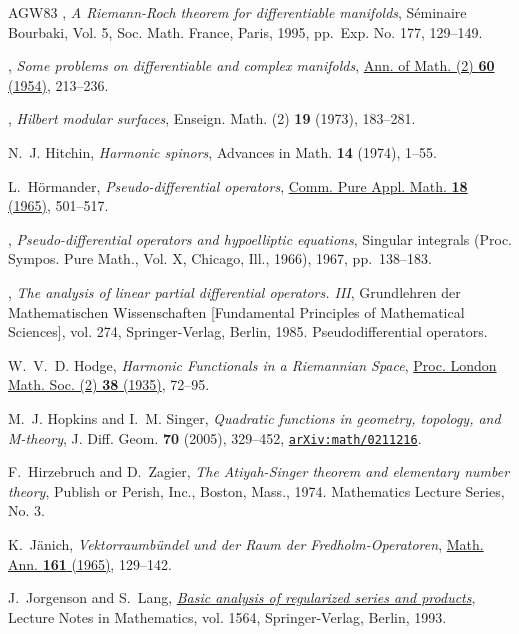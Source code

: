\documentclass[11pt]{amsart}
\theoremstyle{definition}
\theoremstyle{remark}
\theoremstyle{plain}
\numberwithin{equation}{section}
\renewcommand{\:}{\colon}
\begin{document}
\begin{thebibliography}{AGW83}
\bysame, \emph{A {R}iemann-{R}och theorem for differentiable manifolds},
  S\'{e}minaire {B}ourbaki, {V}ol. 5, Soc. Math. France, Paris, 1995, pp.~Exp.
  No. 177, 129--149.

\bysame, \emph{Some problems on differentiable and complex manifolds},
  \href{http://dx.doi.org/10.2307/1969629}{Ann. of Math. (2) \textbf{60}
  (1954)}, 213--236.

\bysame, \emph{Hilbert modular surfaces}, Enseign. Math. (2) \textbf{19}
  (1973), 183--281.

N.~J. Hitchin, \emph{Harmonic spinors}, Advances in Math. \textbf{14} (1974),
  1--55.

L.~H\"{o}rmander, \emph{Pseudo-differential operators},
  \href{http://dx.doi.org/10.1002/cpa.3160180307}{Comm. Pure Appl. Math.
  \textbf{18} (1965)}, 501--517.

\bysame, \emph{Pseudo-differential operators and hypoelliptic equations},
  Singular integrals ({P}roc. {S}ympos. {P}ure {M}ath., {V}ol. {X}, {C}hicago,
  {I}ll., 1966), 1967, pp.~138--183.

\bysame, \emph{The analysis of linear partial differential operators. {III}},
  Grundlehren der Mathematischen Wissenschaften [Fundamental Principles of
  Mathematical Sciences], vol. 274, Springer-Verlag, Berlin, 1985.
  Pseudodifferential operators.

W.~V.~D. Hodge, \emph{Harmonic {F}unctionals in a {R}iemannian {S}pace},
  \href{http://dx.doi.org/10.1112/plms/s2-38.1.72}{Proc. London Math. Soc. (2)
  \textbf{38} (1935)}, 72--95.

M.~J. Hopkins and I.~M. Singer, \emph{Quadratic functions in geometry,
  topology, and {M}-theory}, J. Diff. Geom. \textbf{70} (2005), 329--452,
\href{http://arxiv.org/abs/math/0211216}{{\tt arXiv:math/0211216}}.

F.~Hirzebruch and D.~Zagier, \emph{The {A}tiyah-{S}inger theorem and elementary
  number theory}, Publish or Perish, Inc., Boston, Mass., 1974. Mathematics
  Lecture Series, No. 3.

K.~J\"{a}nich, \emph{Vektorraumb\"{u}ndel und der {R}aum der
  {F}redholm-{O}peratoren}, \href{http://dx.doi.org/10.1007/BF01360851}{Math.
  Ann. \textbf{161} (1965)}, 129--142.

J.~Jorgenson and S.~Lang,
  \href{http://dx.doi.org/10.1007/BFb0077194}{\emph{Basic analysis of
  regularized series and products}}, Lecture Notes in Mathematics, vol. 1564,
  Springer-Verlag, Berlin, 1993.


\end{thebibliography}
\end{document}
